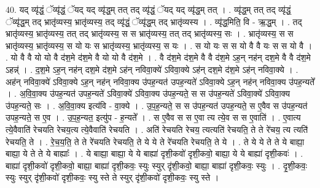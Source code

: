 \documentclass[17pt]{extarticle}
\begin{document}
40. यद् व्यृ॑द्धं॒ ॅव्यृ॑द्धं॒ ॅयद् यद् व्यृ॑द्ध॒म् तत् तद् व्यृ॑द्धं॒ ॅयद् यद् व्यृ॑द्ध॒म् तत् । . व्यृ॑द्ध॒म् तत् तद् व्यृ॑द्धं॒ ॅव्यृ॑द्ध॒म् तद् भ्रातृ॑व्यस्य॒ भ्रातृ॑व्यस्य॒ तद् व्यृ॑द्धं॒ ॅव्यृ॑द्ध॒म् तद् भ्रातृ॑व्यस्य । . व्यृ॑द्ध॒मिति॒ वि - ऋ॒द्ध॒म् । . तद् भ्रातृ॑व्यस्य॒ भ्रातृ॑व्यस्य॒ तत् तद् भ्रातृ॑व्यस्य॒ स स भ्रातृ॑व्यस्य॒ तत् तद् भ्रातृ॑व्यस्य॒ सः । . भ्रातृ॑व्यस्य॒ स स भ्रातृ॑व्यस्य॒ भ्रातृ॑व्यस्य॒ स यो यः स भ्रातृ॑व्यस्य॒ भ्रातृ॑व्यस्य॒ स यः । . स यो यः स स यो वै वै यः स स यो वै । . यो वै वै यो यो वै द॑श॒मे द॑श॒मे वै यो यो वै द॑श॒मे । . वै द॑श॒मे द॑श॒मे वै वै द॑श॒मे ऽह॒न् नह॑न् दश॒मे वै वै द॑श॒मे ऽहन्न्॑ । . द॒श॒मे ऽह॒न् नह॑न् दश॒मे द॑श॒मे ऽह॑न् नविवा॒क्ये॑ ऽविवा॒क्ये ऽह॑न् दश॒मे द॑श॒मे ऽह॑न् नविवा॒क्ये । . अह॑न् नविवा॒क्ये॑ ऽविवा॒क्ये ऽह॒न् नह॑न् नविवा॒क्य उ॑पह॒न्यत॑ उपह॒न्यते॑ ऽविवा॒क्ये ऽह॒न् नह॑न् नविवा॒क्य उ॑पह॒न्यते᳚ । . अ॒वि॒वा॒क्य उ॑पह॒न्यत॑ उपह॒न्यते॑ ऽविवा॒क्ये॑ ऽविवा॒क्य उ॑पह॒न्यते॒ स स उ॑पह॒न्यते॑ ऽविवा॒क्ये॑ ऽविवा॒क्य उ॑पह॒न्यते॒ सः । . अ॒वि॒वा॒क्य इत्य॑वि - वा॒क्ये । . उ॒प॒ह॒न्यते॒ स स उ॑पह॒न्यत॑ उपह॒न्यते॒ स ए॒वैव स उ॑पह॒न्यत॑ उपह॒न्यते॒ स ए॒व । . उ॒प॒ह॒न्यत॒ इत्यु॑प - ह॒न्यते᳚ । . स ए॒वैव स स ए॒वा त्य त्ये॒व स स ए॒वाति॑ । . ए॒वात्य त्ये॒वैवाति॑ रेचयति रेचय॒त्य त्ये॒वैवाति॑ रेचयति । . अति॑ रेचयति रेचय॒ त्यत्यति॑ रेचयति॒ ते ते रे॑चय॒ त्य त्यति॑ रेचयति॒ ते । . रे॒च॒य॒ति॒ ते ते रे॑चयति रेचयति॒ ते ये ये ते रे॑चयति रेचयति॒ ते ये । . ते ये ये ते ते ये बाह्या॒ बाह्या॒ ये ते ते ये बाह्याः᳚ । . ये बाह्या॒ बाह्या॒ ये ये बाह्या॑ दृशी॒कवो॑ दृशी॒कवो॒ बाह्या॒ ये ये बाह्या॑ दृशी॒कवः॑ । . बाह्या॑ दृशी॒कवो॑ दृशी॒कवो॒ बाह्या॒ बाह्या॑ दृशी॒कवः॒ स्युः स्युर् दृ॑शी॒कवो॒ बाह्या॒ बाह्या॑ दृशी॒कवः॒ स्युः । . दृ॒शी॒कवः॒ स्युः स्युर् दृ॑शी॒कवो॑ दृशी॒कवः॒ स्यु स्ते ते स्युर् दृ॑शी॒कवो॑ दृशी॒कवः॒ स्यु स्ते । \newline
\pagebreak
{}
\end{document}
